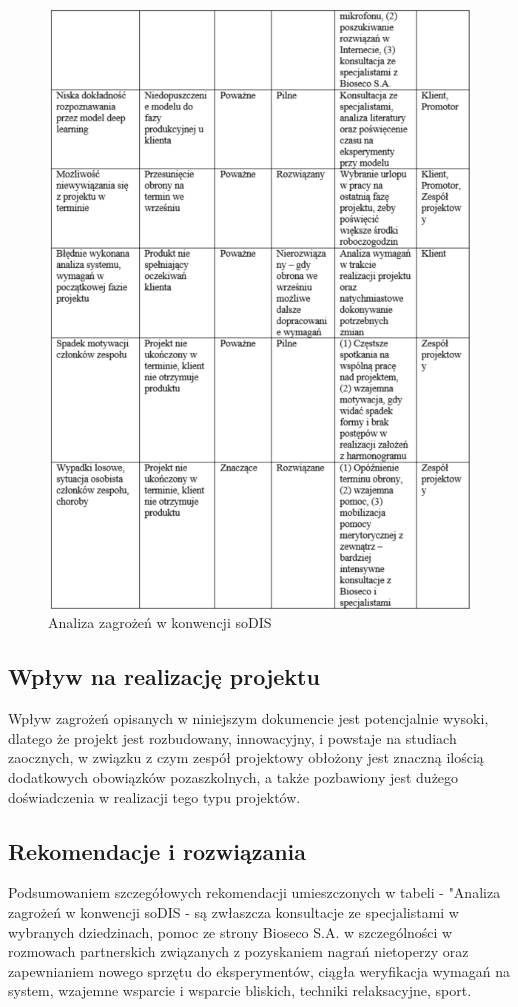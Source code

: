 \documentclass{sprz}
\begin{document}
\begin{figure}[h]
  \centering
  \includegraphics[width=1.0\textwidth]{sprz/sodis2.png}
  \caption{Analiza zagrożeń w konwencji soDIS}
  \label{img:sodis2}
\end{figure}

\subsection{Wpływ na realizację projektu}
Wpływ zagrożeń opisanych w niniejszym dokumencie jest potencjalnie wysoki, dlatego że projekt jest rozbudowany, innowacyjny, i powstaje na studiach zaocznych, w związku z czym zespół projektowy obłożony jest znaczną ilością dodatkowych obowiązków pozaszkolnych, a także pozbawiony jest dużego doświadczenia w realizacji tego typu projektów.

\subsection{Rekomendacje i rozwiązania}
Podsumowaniem szczegółowych rekomendacji umieszczonych w tabeli - "Analiza zagrożeń w konwencji soDIS - są zwłaszcza konsultacje ze specjalistami w wybranych dziedzinach, pomoc ze strony Bioseco S.A. w szczególności w rozmowach partnerskich związanych z pozyskaniem nagrań nietoperzy oraz zapewnianiem nowego sprzętu do eksperymentów, ciągła weryfikacja wymagań na system, wzajemne wsparcie i wsparcie bliskich, techniki relaksacyjne, sport.
\end{document}
